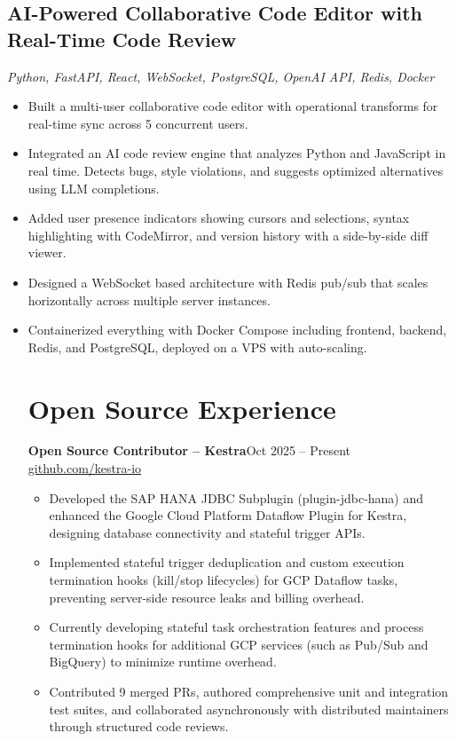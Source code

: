 \documentclass[10pt]{article}
\begin{document}
\subsection{AI-Powered Collaborative Code Editor with Real-Time Code Review}
\textit{Python, FastAPI, React, WebSocket, PostgreSQL, OpenAI API, Redis, Docker}
\begin{itemize}
  \item Built a multi-user collaborative code editor with operational transforms for real-time sync across 5 concurrent users.
  \item Integrated an AI code review engine that analyzes Python and JavaScript in real time. Detects bugs, style violations, and suggests optimized alternatives using LLM completions.
  \item Added user presence indicators showing cursors and selections, syntax highlighting with CodeMirror, and version history with a side-by-side diff viewer.
  \item Designed a WebSocket based architecture with Redis pub/sub that scales horizontally across multiple server instances.
  \item Containerized everything with Docker Compose including frontend, backend, Redis, and PostgreSQL, deployed on a VPS with auto-scaling.

\section{Open Source Experience}
\textbf{Open Source Contributor -- Kestra}\hfill Oct 2025 -- Present\\
\href{https://github.com/kestra-io}{github.com/kestra-io}
\begin{itemize}
  \item Developed the SAP HANA JDBC Subplugin (plugin-jdbc-hana) and enhanced the Google Cloud Platform Dataflow Plugin for Kestra, designing database connectivity and stateful trigger APIs.
  \item Implemented stateful trigger deduplication and custom execution termination hooks (kill/stop lifecycles) for GCP Dataflow tasks, preventing server-side resource leaks and billing overhead.
  \item Currently developing stateful task orchestration features and process termination hooks for additional GCP services (such as Pub/Sub and BigQuery) to minimize runtime overhead.
  \item Contributed 9 merged PRs, authored comprehensive unit and integration test suites, and collaborated asynchronously with distributed maintainers through structured code reviews.
\end{itemize}


\end{itemize}
\end{document}
